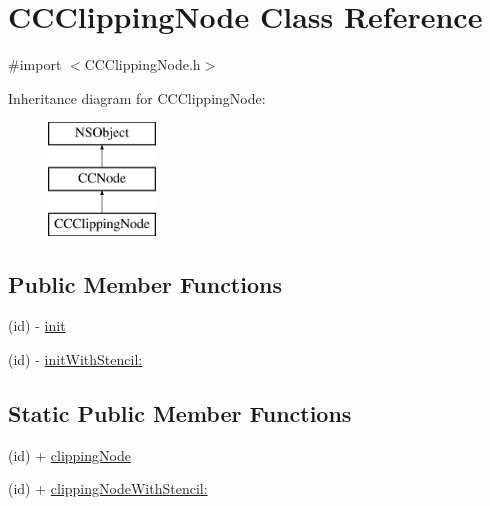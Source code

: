 \hypertarget{interface_c_c_clipping_node}{\section{C\-C\-Clipping\-Node Class Reference}
\label{interface_c_c_clipping_node}
}


{\ttfamily \#import $<$C\-C\-Clipping\-Node.\-h$>$}

Inheritance diagram for C\-C\-Clipping\-Node\-:\begin{figure}[H]
\begin{center}
\leavevmode
\includegraphics[height=3.000000cm]{interface_c_c_clipping_node}
\end{center}
\end{figure}
\subsection*{Public Member Functions}
\begin{DoxyCompactItemize}
\item 
(id) -\/ \hyperlink{interface_c_c_clipping_node_a20a68e2646b7659063e58aa4d4b6de1f}{init}
\item 
(id) -\/ \hyperlink{interface_c_c_clipping_node_a8201cd017497224668128061904ebc7a}{init\-With\-Stencil\-:}
\end{DoxyCompactItemize}
\subsection*{Static Public Member Functions}
\begin{DoxyCompactItemize}
\item 
(id) + \hyperlink{interface_c_c_clipping_node_a0c83cee4408ddf27098aa482e61f4938}{clipping\-Node}
\item 
(id) + \hyperlink{interface_c_c_clipping_node_a4788712b40f1e4624ec9942feb143873}{clipping\-Node\-With\-Stencil\-:}
\end{DoxyCompactItemize}
